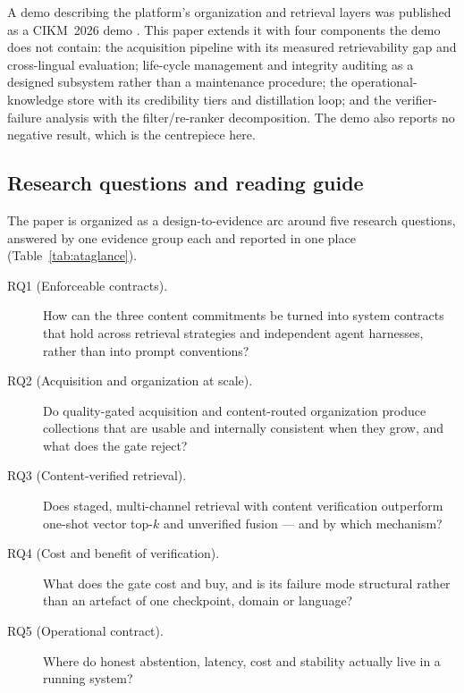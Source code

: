 A demo describing the platform's organization and retrieval layers was
published as a CIKM~2026 demo \cite{qdcvr-demo}. This paper extends it with
four components the demo does not contain: the acquisition pipeline with its
measured retrievability gap and cross-lingual evaluation; life-cycle
management and integrity auditing as a designed subsystem rather than a
maintenance procedure; the operational-knowledge store with its credibility
tiers and distillation loop; and the verifier-failure analysis with the
filter/re-ranker decomposition. The demo also reports no negative result, which
is the centrepiece here.

\subsection{Research questions and reading guide}
\label{sec:rq}

The paper is organized as a design-to-evidence arc around five research
questions, answered by one evidence group each and reported in one place
(Table~\ref{tab:ataglance}).

\begin{description}
\item[RQ1 (Enforceable contracts).] How can the three content commitments be
turned into system contracts that hold across retrieval strategies and
independent agent harnesses, rather than into prompt conventions?
\item[RQ2 (Acquisition and organization at scale).] Do quality-gated
acquisition and content-routed organization produce collections that are
usable and internally consistent when they grow, and what does the gate
reject?
\item[RQ3 (Content-verified retrieval).] Does staged, multi-channel retrieval
with content verification outperform one-shot vector top-$k$ and unverified
fusion --- and by which mechanism?
\item[RQ4 (Cost and benefit of verification).] What does the gate cost and
buy, and is its failure mode structural rather than an artefact of one
checkpoint, domain or language?
\item[RQ5 (Operational contract).] Where do honest abstention, latency, cost
and stability actually live in a running system?
\end{description}


